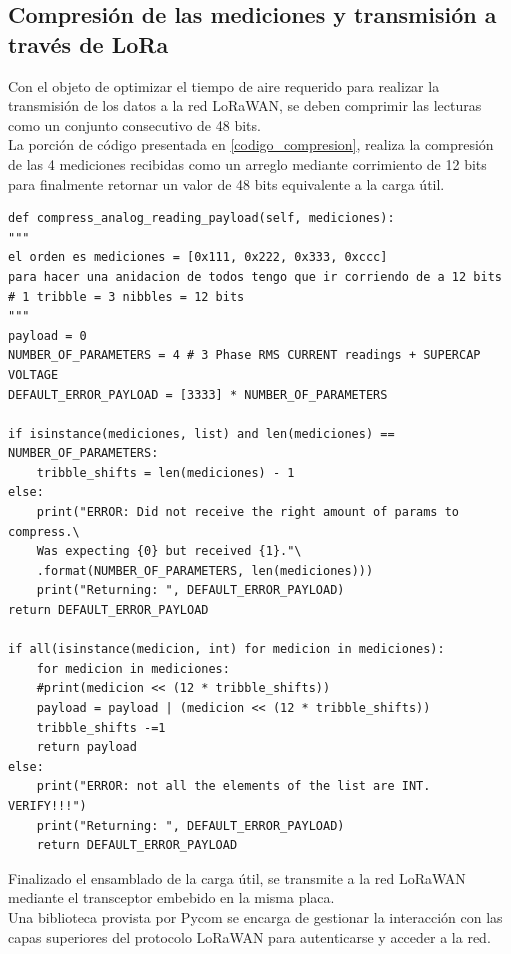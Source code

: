 \subsection{Compresión de las mediciones y transmisión a través de LoRa}\label{compresion_lecturas}
Con el objeto de optimizar el tiempo de aire requerido para realizar la transmisión de los datos a la red LoRaWAN, se deben comprimir las lecturas como un conjunto consecutivo de 48 bits.\\
La porción de código presentada en \ref{codigo_compresion}, realiza la compresión de las 4 mediciones recibidas como un arreglo mediante corrimiento de 12 bits para finalmente retornar un valor de 48 bits equivalente a la carga útil.\\

\lstset{language=python}
\begin{lstlisting}[label=codigo_compresion,caption=Función encargada de comprimir las 4 lecturas de 12 bits.]
def compress_analog_reading_payload(self, mediciones):
"""
el orden es mediciones = [0x111, 0x222, 0x333, 0xccc]
para hacer una anidacion de todos tengo que ir corriendo de a 12 bits
# 1 tribble = 3 nibbles = 12 bits
"""
payload = 0
NUMBER_OF_PARAMETERS = 4 # 3 Phase RMS CURRENT readings + SUPERCAP VOLTAGE
DEFAULT_ERROR_PAYLOAD = [3333] * NUMBER_OF_PARAMETERS

if isinstance(mediciones, list) and len(mediciones) == NUMBER_OF_PARAMETERS:
	tribble_shifts = len(mediciones) - 1
else:
	print("ERROR: Did not receive the right amount of params to compress.\
	Was expecting {0} but received {1}."\
	.format(NUMBER_OF_PARAMETERS, len(mediciones)))
	print("Returning: ", DEFAULT_ERROR_PAYLOAD)
return DEFAULT_ERROR_PAYLOAD

if all(isinstance(medicion, int) for medicion in mediciones):
	for medicion in mediciones:
	#print(medicion << (12 * tribble_shifts))
	payload = payload | (medicion << (12 * tribble_shifts))
	tribble_shifts -=1
	return payload
else:
	print("ERROR: not all the elements of the list are INT. VERIFY!!!")
	print("Returning: ", DEFAULT_ERROR_PAYLOAD)
	return DEFAULT_ERROR_PAYLOAD
\end{lstlisting}

Finalizado el ensamblado de la carga útil, se transmite a la red LoRaWAN mediante el transceptor embebido en la misma placa.\\
Una biblioteca provista por Pycom se encarga de gestionar la interacción con las capas superiores del protocolo LoRaWAN para autenticarse y acceder a la red.\\

